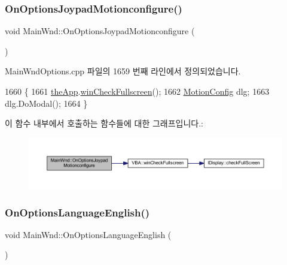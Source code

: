 \subsubsection{\texorpdfstring{On\+Options\+Joypad\+Motionconfigure()}{OnOptionsJoypadMotionconfigure()}}
{\footnotesize\ttfamily void Main\+Wnd\+::\+On\+Options\+Joypad\+Motionconfigure (\begin{DoxyParamCaption}{ }\end{DoxyParamCaption})\hspace{0.3cm}{\ttfamily [protected]}}



Main\+Wnd\+Options.\+cpp 파일의 1659 번째 라인에서 정의되었습니다.


\begin{DoxyCode}
1660 \{
1661   \mbox{\hyperlink{_v_b_a_8cpp_a8095a9d06b37a7efe3723f3218ad8fb3}{theApp}}.\mbox{\hyperlink{class_v_b_a_a340eaeeb7fcfc242f08ac3442d991a96}{winCheckFullscreen}}();
1662   \mbox{\hyperlink{class_motion_config}{MotionConfig}} dlg;
1663   dlg.DoModal();
1664 \}
\end{DoxyCode}
이 함수 내부에서 호출하는 함수들에 대한 그래프입니다.\+:
\nopagebreak
\begin{figure}[H]
\begin{center}
\leavevmode
\includegraphics[width=350pt]{class_main_wnd_a53193c4dc50dce98008dfbd3644ee1ca_cgraph}
\end{center}
\end{figure}
\mbox{\label{class_main_wnd_a611b1bde0b2a2ca47ace63d4dec8c27a}} 
\subsubsection{\texorpdfstring{On\+Options\+Language\+English()}{OnOptionsLanguageEnglish()}}
{\footnotesize\ttfamily void Main\+Wnd\+::\+On\+Options\+Language\+English (\begin{DoxyParamCaption}{ }\end{DoxyParamCaption})\hspace{0.3cm}{\ttfamily [protected]}}



